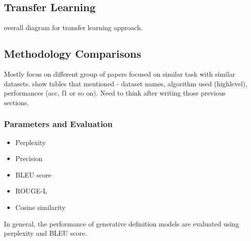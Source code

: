 \subsection{Transfer Learning}
overall diagram for transfer learning approach.

\subsection{Methodology Comparisons}
Mostly focus on different group of papers focused on similar task with similar
datasets. show tables that mentioned - dataset names, algorithm used
(highlevel), performances (acc, f1 or so on). Need to think after writing those
previous sections.

\subsubsection{Parameters and Evaluation}
\begin{itemize}
    \item Perplexity
    \item Precision
    \item BLEU score
    \item ROUGE-L
    \item Cosine similarity
\end{itemize}

In general, the performance of generative definition models are evaluated using
perplexity and BLEU score.
